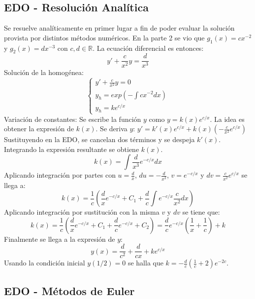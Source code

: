 \documentclass{endm}
\begin{document}
\subsection{EDO - Resolución Analítica}
Se resuelve analíticamente en primer lugar a fin de poder evaluar la solución provista por distintos métodos numéricos.
En la parte 2 se vio que $g_1(x) = cx^{-2}$ y $g_2(x) = dx^{-3}$ con $c,d \in \mathbb{R}$.
La ecuación diferencial es entonces:
\begin{equation}
    y' + \frac{c}{x^2}y = \frac{d}{x^3}
\end{equation}
Solución de la homogénea:
 \begin{equation*}
\begin{cases}
    y' + \frac{c}{x^2}y = 0 \\
    y_h = exp(-\int cx^{-2}dx) \\
    y_h = ke^{c/x}
\end{cases}
\end{equation*}
Variación de constantes:
Se escribe la función $y$ como $y = k(x)e^{c/x}$. La idea es obtener la expresión de $k(x)$.
Se deriva $y$: $y' = k'(x)e^{c/x} + k(x)\left(-\frac{c}{x^2}e^{c/x}\right)$
Sustituyendo en la EDO, se cancelan dos términos y se despeja $k'(x)$. Integrando la expresión resultante se obtiene $k(x)$.
\begin{equation}
    k(x) = \int \frac{d}{x^3}e^{-c/x}dx
\end{equation}
Aplicando integración por partes con $u = \frac{d}{x}$, $du = -\frac{d}{x^2}$, $v = e^{-c/x}$ y $dv = \frac{c}{x^2}e^{c/x}$ se llega a:
\begin{equation}
    k(x) = \frac{1}{c}\left( \frac{d}{x}e^{-c/x} + C_1 + \frac{d}{c}\int e^{-c/x}\frac{c}{x^2}dx \right)
\end{equation}
Aplicando integración por sustitución con la misma $v$ y $dv$ se tiene que:
\begin{equation}
    k(x) = \frac{1}{c}\left( \frac{d}{x}e^{-c/x} + C_1 + \frac{d}{c}e^{-c/x} + C_2 \right) =
    \frac{d}{c}e^{-c/x}\left( \frac{1}{x} + \frac{1}{c} \right) + k
\end{equation}
Finalmente se llega a la expresión de $y$:
\begin{equation}
    y(x) = \frac{d}{c^2} + \frac{d}{cx}+ ke^{c/x}
\end{equation}
Usando la condición inicial $y(1/2) = 0$ se halla que $k = -\frac{d}{c}\left( \frac{1}{c} + 2 \right)e^{-2c}$.

\subsection{EDO - Métodos de Euler}
\end{document}
